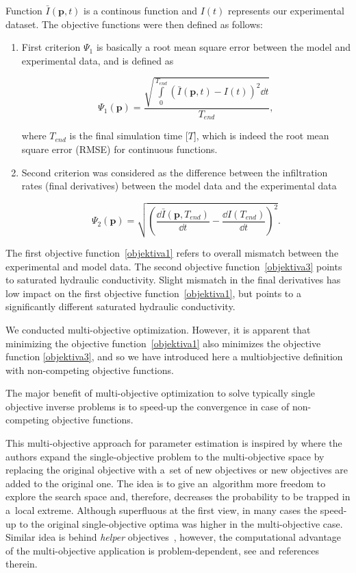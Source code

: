 \documentclass[review,times,3p,10pt]{elsarticle}
\newenvironment{lineq}
    {\begin{linenomath*}
    \begin{equation}
    }
    { 
    \end{equation} 
    \end{linenomath*}
    }
\renewcommand{\vec}{\mathbf}
\begin{document}
{ Function $\bar{I}(\vec{p},t)$ is a continous function and $I(t)$ represents our experimental dataset. The objective functions were then defined as follows:
\begin{enumerate}[label={\bf \Roman*}.]
\item First criterion $\Psi_1$ is basically a root mean square error between the model and experimental data, and is defined as
\begin{lineq}
\label{objektiva1}
\Psi_1 (\vec{p}) = \frac{\sqrt{\int\limits_0^{T_{end}} \left( \bar{I}(\vec{p},t) - I(t) \right)^2 \dd t}}{T_{end}},
\end{lineq}
where $T_{end}$ is the final simulation time [$T$], which is indeed the root mean square error (RMSE) for continuous functions. 

\item Second criterion was considered as the difference between the infiltration rates (final derivatives) between the model data and the experimental data
\begin{lineq}
\label{objektiva3}
\Psi_2 (\vec{p}) =  \sqrt{\left( \frac{\dd \bar{I}(\vec{p},T_{end})}{\dd t} - \frac{\dd I(T_{end})}{\dd t} \right)^2}.
\end{lineq}


\end{enumerate}

{ The first objective function~\eqref{objektiva1} refers to overall mismatch between the experimental and model data. 
The second objective function~\eqref{objektiva3} points to saturated hydraulic conductivity. Slight mismatch in the final derivatives has low impact on the first objective function~\eqref{objektiva1}, but points to a significantly different saturated hydraulic conductivity. }

 We conducted multi-objective optimization. However, it is apparent that minimizing the objective function~\eqref{objektiva1} also minimizes the objective function \eqref{objektiva3}, and so we have introduced here a multiobjective definition with  non-competing objective functions. 

The major benefit of multi-objective optimization  to solve typically single objective inverse problems is to speed-up the convergence in
case of non-competing objective functions.

This multi-objective approach  for parameter estimation is inspired by \cite{knowles:2001} where the authors expand the
single-objective problem to the multi-objective space by replacing the original objective with a~set of new objectives
or new objectives are added to the original one. The idea is to give an~algorithm more freedom to explore the search
space and, therefore, decreases the probability to be trapped in a~local extreme. Although superfluous at the first
view, in many cases the speed-up to the original single-objective optima was higher in the multi-objective case.
Similar idea is behind {\it helper} objectives~\citep{Jensen:2004}, however, the computational advantage of the
multi-objective application is problem-dependent, see \citep{vitingerova:2010} and references therein.



}
\end{document}
